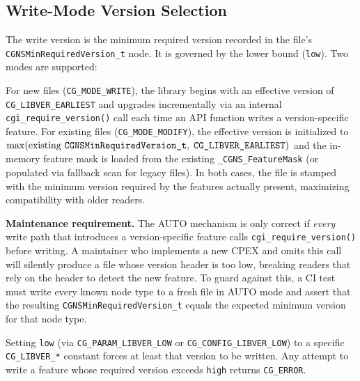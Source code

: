 \documentclass[11pt,letterpaper]{article}
\begin{document}
\subsection{Write-Mode Version Selection}
\label{sec:write-mode}

The write version is the minimum required version recorded in the file's
\texttt{CGNSMinRequiredVersion\_t} node.  It is governed by the lower
bound (\texttt{low}).  Two modes are supported:

\begin{description}[leftmargin=2em]
\item[\texttt{low~=~CG\_LIBVER\_AUTO} (default).]
  For new files (\texttt{CG\_MODE\_WRITE}), the library begins with an
  effective version of \texttt{CG\_LIBVER\_EARLIEST} and upgrades
  incrementally via an internal \texttt{cgi\_require\_version()} call
  each time an API function writes a version-specific feature.  For
  existing files (\texttt{CG\_MODE\_MODIFY}), the effective version is
  initialized to $\max(\text{existing~\texttt{CGNSMinRequiredVersion\_t}},\;
  \texttt{CG\_LIBVER\_EARLIEST})$ and the in-memory feature mask is
  loaded from the existing \texttt{\_CGNS\_FeatureMask} (or populated
  via fallback scan for legacy files).  In both cases, the file is
  stamped with the minimum version required by the features actually
  present, maximizing compatibility with older readers.

  \textbf{Maintenance requirement.}  The AUTO mechanism is only
  correct if \emph{every} write path that introduces a version-specific
  feature calls \texttt{cgi\_require\_version()} before writing.  A
  maintainer who implements a new CPEX and omits this call will
  silently produce a file whose version header is too low, breaking
  readers that rely on the header to detect the new feature.  To guard
  against this, a CI test must write every known node type to a fresh
  file in AUTO mode and assert that the resulting
  \texttt{CGNSMinRequiredVersion\_t} equals the expected minimum
  version for that node type.

\item[\texttt{low~=} explicit version constant.]
  Setting \texttt{low} (via \texttt{CG\_PARAM\_LIBVER\_LOW} or
  \texttt{CG\_CONFIG\_LIBVER\_LOW}) to a specific
  \texttt{CG\_LIBVER\_*} constant forces at least that version to be
  written.  Any attempt to write a feature whose required version
  exceeds \texttt{high} returns \texttt{CG\_ERROR}.


\end{description}
\end{document}
